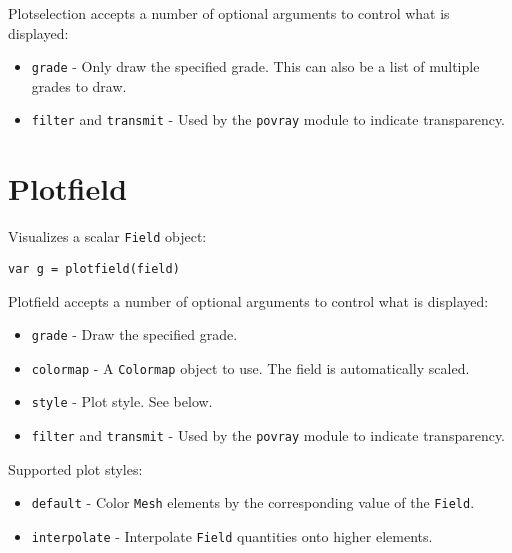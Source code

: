 Plotselection accepts a number of optional arguments to control what is
displayed:

\begin{itemize}

\item
  \texttt{grade} - Only draw the specified grade. This can also be a
  list of multiple grades to draw.
\item
  \texttt{filter} and \texttt{transmit} - Used by the \texttt{povray}
  module to indicate transparency.
\end{itemize}

\hypertarget{plotfield}{%
\section{Plotfield}\label{plotfield}}

Visualizes a scalar \texttt{Field} object:

\begin{lstlisting}
var g = plotfield(field)
\end{lstlisting}

Plotfield accepts a number of optional arguments to control what is
displayed:

\begin{itemize}

\item
  \texttt{grade} - Draw the specified grade.
\item
  \texttt{colormap} - A \texttt{Colormap} object to use. The field is
  automatically scaled.
\item
  \texttt{style} - Plot style. See below.
\item
  \texttt{filter} and \texttt{transmit} - Used by the \texttt{povray}
  module to indicate transparency.
\end{itemize}

Supported plot styles:

\begin{itemize}

\item
  \texttt{default} - Color \texttt{Mesh} elements by the corresponding
  value of the \texttt{Field}.
\item
  \texttt{interpolate} - Interpolate \texttt{Field} quantities onto
  higher elements.
\end{itemize}
